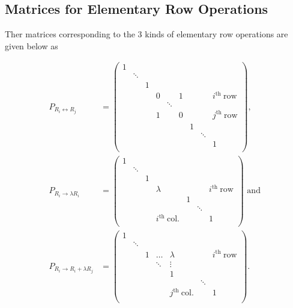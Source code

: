 \documentclass[a4paper,12pt]{report}
\begin{document}
\begin{appendices}
\section{Matrices for Elementary Row Operations} \label{APA} 

Ther matrices corresponding to the 3 kinds of elementary row operations are given below as

\begin{equation}
    \begin{aligned}
    P_{R_{i} \leftrightarrow R_{j}  } &= \begin{pmatrix}
        1 &  &  &  &  &  &  &  &   \\
         & \ddots  &  &  &  &  &  &  &   \\
         &  & 1 &  &  &  &  &  &   \\
         &  &  & 0 &  & 1 &  &  & i^{\text{th }}\text{row}    \\
         &  &  &  & \ddots  &  &  &  &   \\
         &  &  & 1 &  & 0 &  &  & j^{\text{th }}\text{row}   \\
         &  &  &  &  &  & 1 &  &   \\
         &  &  &  &  &  &  & \ddots  &   \\
         &  &  &  &  &  &  &  &  1 \\
    \end{pmatrix}, \\
    P_{R_{i} \rightarrow \lambda R_{i}  } &= \begin{pmatrix}
        1 &  &  &  &  &  &   \\
         & \ddots  &  &  &  &  &   \\
         &  & 1 &  &  &  &   \\
         &  &  & \lambda  &  &  & i^{\text{th }}\text{row}   \\
         &  &  &  & 1 &  &   \\
         &  &  &  &  & \ddots  &   \\
         &  &  & i^{\text{th }}\text{col.}  &  &  &  1 \\
    \end{pmatrix} \text { and } \\
    P_{R_{i} \rightarrow R_{i}+\lambda R_{j}   } &= \begin{pmatrix}
        1 &  &  &  &  &  &   \\
         & \ddots  &  &  &  &  &   \\
         &  & 1 & \ldots  & \lambda  &  & i^{\text{th }}\text{row}   \\
         &  &  & \ddots  & \vdots  &  &   \\
         &  &  &  & 1 &  &   \\
         &  &  &  &  & \ddots  &   \\
         &  &  &  & j^{\text{th }}\text{col.}  &  & 1  \\
    \end{pmatrix} .
    \end{aligned}
\end{equation}




\end{appendices}
\end{document}
